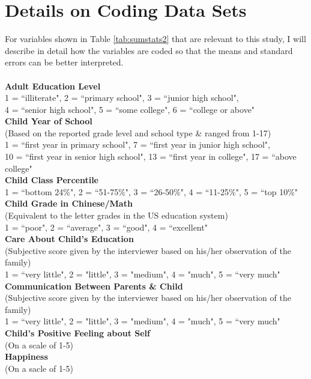 \documentclass[12pt]{extarticle}
\begin{document}
\section{Details on Coding Data Sets} \label{coding}
\indent For variables shown in Table \ref{tab:sumstats2} that are relevant to this study, I will describe in detail how the variables are coded so that the means and standard errors can be better interpreted. \\
\\
\textbf{Adult Education Level} \\
1 = ``illiterate", 2 = ``primary school", 3 = ``junior high school", \\ 4 = ``senior high school", 5 = ``some college", 6 = ``college or above" \\
\textbf{Child Year of School} \\
(Based on the reported grade level and school type \& ranged from 1-17) \\
1 = ``first year in primary school", 7 = ``first year in junior high school", \\ 10 = ``first year in senior high school", 13 = ``first year in college", 17 = ``above college" \\
\textbf{Child Class Percentile} \\
1 = ``bottom 24\%", 2 = ``51-75\%", 3 = ``26-50\%", 4 = ``11-25\%", 5 = ``top 10\%" \\
\textbf{Child Grade in Chinese/Math} \\
(Equivalent to the letter grades in the US education system) \\
1 = ``poor", 2 = ``average", 3 = ``good", 4 = ``excellent" \\ \textbf{Care About Child's Education} \\
(Subjective score given by the interviewer based on his/her observation of the family) \\
1 = ``very little", 2 = "little", 3 = "medium", 4 = "much", 5 = ``very much" \\
\textbf{Communication Between Parents \& Child} \\
(Subjective score given by the interviewer based on his/her observation of the family) \\
1 = ``very little", 2 = "little", 3 = "medium", 4 = "much", 5 = ``very much" \\
\textbf{Child's Positive Feeling about Self} \\
(On a scale of 1-5) \\
\textbf{Happiness} \\
(On a sacle of 1-5)
\end{document}
